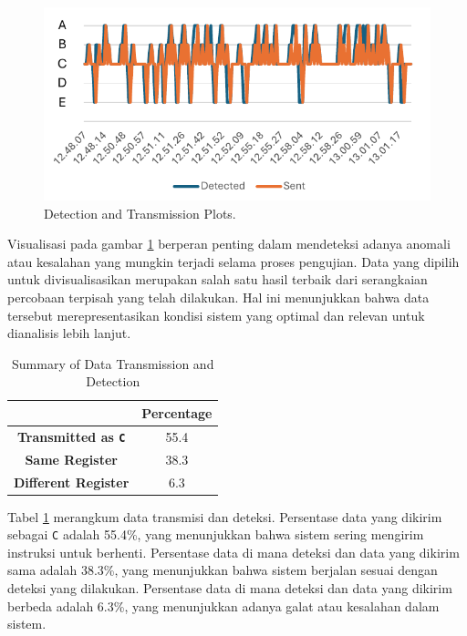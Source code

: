 \begin{figure}[H]
    \centering
    \includegraphics[width=1\textwidth]{gambar/tex/sents.pdf}
    \caption{Detection and Transmission Plots.}
    \label{fig:detection_transmission_plots}
\end{figure}

Visualisasi pada gambar \ref{fig:detection_transmission_plots} berperan penting dalam mendeteksi adanya anomali atau kesalahan yang mungkin terjadi selama proses pengujian. Data yang dipilih untuk divisualisasikan merupakan salah satu hasil terbaik dari serangkaian percobaan terpisah yang telah dilakukan. Hal ini menunjukkan bahwa data tersebut merepresentasikan kondisi sistem yang optimal dan relevan untuk dianalisis lebih lanjut.

\begin{table}[H]
    \centering
    \caption{Summary of Data Transmission and Detection}
    \label{tab:summary_data_transmission_detection}
    \begin{tabular}{|c|c|}
        \hline 
        \cellcolor[HTML]{000000} & \cellcolor[HTML]{C0C0C0} \textbf{Percentage}   \\ \hline
        \cellcolor[HTML]{C0C0C0} \textbf{Transmitted as \texttt{C}} & 55.4  \\ \hline
        \cellcolor[HTML]{C0C0C0} \textbf{Same Register}  & 38.3 \\ \hline
        \cellcolor[HTML]{C0C0C0} \textbf{Different Register}  & 6.3 \\ \hline
    \end{tabular}
\end{table}

Tabel \ref{tab:summary_data_transmission_detection} merangkum data transmisi dan deteksi. Persentase data yang dikirim sebagai \texttt{C} adalah 55.4\%, yang menunjukkan bahwa sistem sering mengirim instruksi untuk berhenti. Persentase data di mana deteksi dan data yang dikirim sama adalah 38.3\%, yang menunjukkan bahwa sistem berjalan sesuai dengan deteksi yang dilakukan. Persentase data di mana deteksi dan data yang dikirim berbeda adalah 6.3\%, yang menunjukkan adanya galat atau kesalahan dalam sistem.

